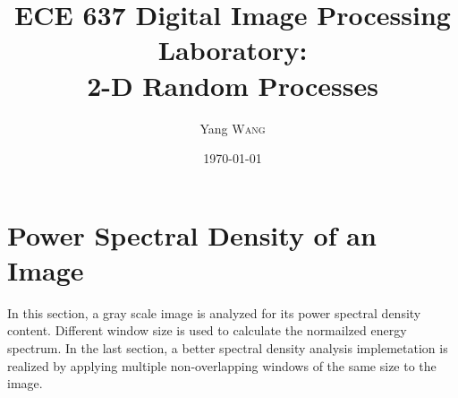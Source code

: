 \documentclass{article}
\title{ECE 637 Digital Image Processing Laboratory: \\ 2-D Random Processes} %
\author{Yang \textsc{Wang}} %
\date{\today} %
\begin{document}
\maketitle %





\section{Power Spectral Density of an Image}

In this section, a gray scale image is analyzed for its power spectral density content.
Different window size is used to calculate the normailzed energy spectrum. In the last
section, a better spectral density analysis implemetation is realized by applying multiple
non-overlapping windows of the same size to the image.
\end{document}

